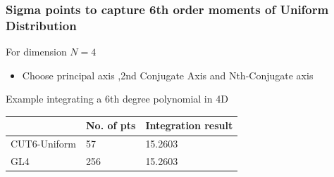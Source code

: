 \documentclass{beamer}
\begin{document}
\begin{frame}
\frametitle{Sigma points to capture 6th order moments of Uniform Distribution}
For dimension $N=4$
\begin{itemize}
\item Choose principal axis ,2nd Conjugate Axis and Nth-Conjugate axis
\end{itemize}
Example integrating a 6th degree polynomial in 4D
\begin{center}
  \begin{tabular}{ | l | l | l |}
    \hline
                  					&   No. of pts			& Integration result 	\\ 
    \hline 
      CUT6-Uniform          &   57       		  & 15.2603             \\
     \hline
      GL4          					&   256       		  & 15.2603             \\
      \hline
  \end{tabular}
\end{center}
\end{frame}
\end{document}
